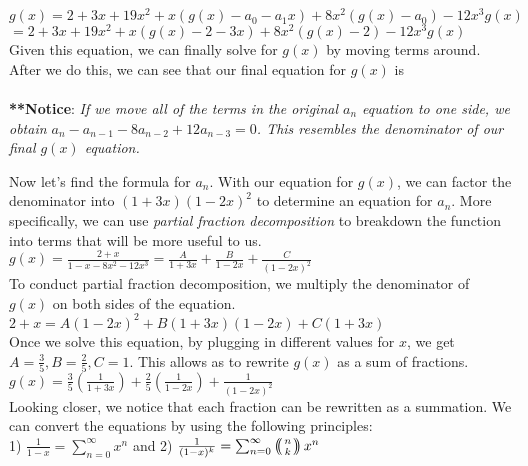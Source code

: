 \documentclass[11pt,twosided]{article}
\begin{document}
\begin{solution}
$g(x) = 2 + 3x + 19x^2 + x(g(x) - a_0 - a_1x) + 8x^2(g(x) - a_0) - 12x^3g(x)$
\\ \indent \indent $ = 2 + 3x + 19x^2 + x(g(x) - 2 - 3x) + 8x^2(g(x) - 2) - 12x^3g(x)$ \\

\noindent
Given this equation, we can finally solve for $g(x)$ by moving terms around. After we do this, we can see that our final equation for $g(x)$ is \\

\\

\noindent\normalsize
\textbf{**Notice}: \textit{If we move all of the terms in the original $a_n$ equation to one side, we obtain $a_n - a_{n-1} - 8a_{n-2} + 12a_{n-3} = 0$. This resembles the denominator of our final $g(x)$ equation.} 

\noindent
Now let's find the formula for $a_n$. With our equation for $g(x)$, we can factor the denominator into $(1 + 3x)(1 - 2x)^2$ to determine an equation for $a_n$. More specifically, we can use \textit{partial fraction decomposition} to breakdown the function into terms that will be more useful to us.\\

$g(x) = \frac{2 + x}{1 - x - 8x^2 - 12x^3} = \frac{A}{1 + 3x} + \frac{B}{1 - 2x} + \frac{C}{(1-2x)^2}$ \\

\noindent
To conduct partial fraction decomposition, we multiply the denominator of $g(x)$ on both sides of the equation.\\

$2 + x = A(1-2x)^2 + B(1 + 3x)(1 - 2x) + C(1 + 3x)$\\

\noindent
Once we solve this equation, by plugging in different values for $x$, we get 
$A = \frac{3}{5}, B = \frac{2}{5}, C = 1$. This allows as to rewrite $g(x)$ as a sum of fractions. \\

{$g(x) = \frac{3}{5}(\frac{1}{1 + 3x}) + \frac{2}{5}(\frac{1}{1 - 2x}) + \frac{1}{(1-2x)^2}$}\\

\noindent\normalsize
Looking closer, we notice that each fraction can be rewritten as a summation. We can convert the equations by using the following principles:\\

1) $\frac{1}{1 - x} = \sum_{n = 0}^\infty x^n$ and 
2) $\frac{1}{(1 - x)^k} = \sum_{n = 0}^\infty \multiset{n}{k}x^n$\\


\end{solution}
\end{document}
